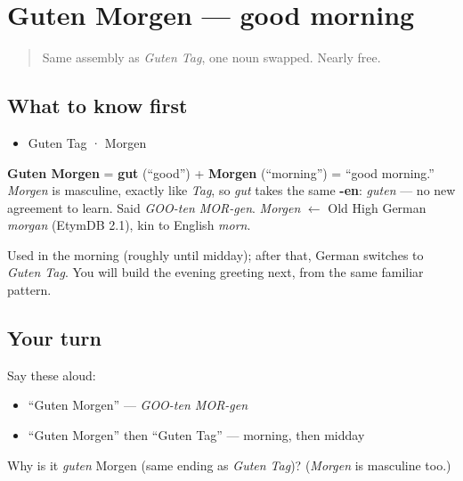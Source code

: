 \section[Guten Morgen]{Guten Morgen — good morning}

\label{lesson:GE-C01-guten-morgen}



\begin{quote}
Same assembly as \emph{Guten Tag}, one noun swapped. Nearly free.
\end{quote}

\subsection*{What to know first}
\begin{itemize}
\raggedright
  \item Guten Tag · Morgen
\end{itemize}

\begin{cousinweb}
\textbf{Guten Morgen} = \textbf{gut} (\textquotedblleft{}good\textquotedblright{}) + \textbf{Morgen} (\textquotedblleft{}morning\textquotedblright{}) = \textquotedblleft{}good morning.\textquotedblright{} \emph{Morgen} is masculine, exactly like \emph{Tag}, so \emph{gut} takes the same \textbf{-en}: \emph{guten} — no new agreement to learn. Said \emph{GOO-ten MOR-gen}. \emph{Morgen} $\leftarrow$ Old High German \emph{morgan} (EtymDB 2.1), kin to English \emph{morn}.

Used in the morning (roughly until midday); after that, German switches to \emph{Guten Tag}. You will build the evening greeting next, from the same familiar pattern.
\end{cousinweb}

\subsection*{Your turn}
Say these aloud:

\begin{itemize}
\raggedright
  \item \textquotedblleft{}Guten Morgen\textquotedblright{} — \emph{GOO-ten MOR-gen}
  \item \textquotedblleft{}Guten Morgen\textquotedblright{} then \textquotedblleft{}Guten Tag\textquotedblright{} — morning, then midday
\end{itemize}

\begin{tcolorbox}[breakable,colback=teal!4,colframe=teal!35!black,title={Before you move on}]
Why is it \emph{guten} Morgen (same ending as \emph{Guten Tag})? (\emph{Morgen} is masculine too.)
\end{tcolorbox}
